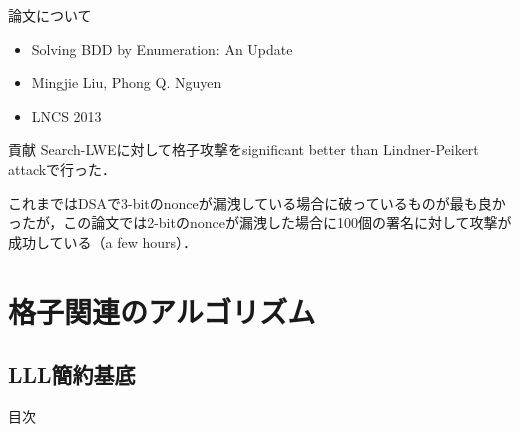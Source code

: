 \documentclass[dvipdfm]{beamer}
\theoremstyle{example}
\begin{document}
\begin{frame}{論文について}
    \begin{block}{}
        \begin{itemize}
            \item Solving {BDD} by Enumeration: An Update
            \item Mingjie Liu, Phong Q. Nguyen
            \item LNCS 2013
        \end{itemize}
    \end{block}
    \begin{block}{貢献}
        Search-LWEに対して格子攻撃をsignificant better than Lindner-Peikert attackで行った．

        これまではDSAで3-bitのnonceが漏洩している場合に破っているものが最も良かったが，この論文では2-bitのnonceが漏洩した場合に100個の署名に対して攻撃が成功している（a few hours）．
    \end{block}
\end{frame}



\section{格子関連のアルゴリズム}
\subsection{LLL簡約基底}

\begin{frame}{目次}
    \tableofcontents[currentsubsection]
\end{frame}
\end{document}
